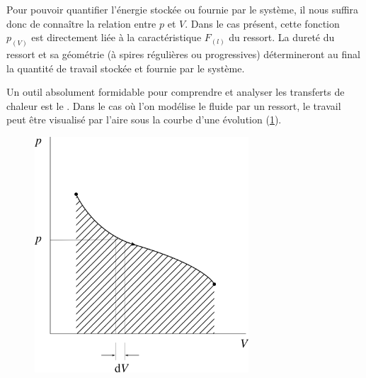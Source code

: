 		Pour pouvoir quantifier l’énergie stockée ou fournie par le système, il nous suffira donc de connaître la relation entre $p$ et $V$. Dans le cas présent, cette fonction $p_{(V)}$ est directement liée à la caractéristique $F_{(l)}$ du ressort. La dureté du ressort et sa géométrie (à spires régulières ou progressives) détermineront au final la quantité de travail stockée et fournie par le système.
		
		Un outil absolument formidable pour comprendre et analyser les transferts de chaleur est le . Dans le cas où l’on modélise le fluide par un ressort, le travail peut être visualisé par l’aire sous la courbe d’une évolution (\cref{fig_p-v_ressort}).		

		\begin{figure}
			\begin{center}
				\includegraphics[width=8cm]{images/pv_ressort.png}
			\end{center}
			\label{fig_p-v_ressort}
		\end{figure}

